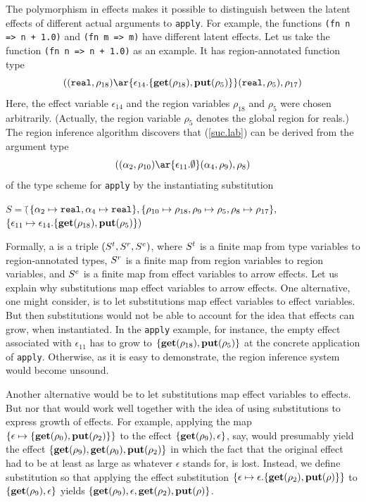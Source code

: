 \documentclass[12pt]{book}
\begin{document}
The polymorphism in effects makes it possible to distinguish between
the latent effects of different actual arguments to {\tt apply}. For
example, the functions {\tt (fn n => n + 1.0)} and {\tt (fn m => m)}
have different latent effects. Let us take the function {\tt (fn n =>
  n + 1.0)} as an example. It has region-annotated function type
\begin{equation}
\label{suc.lab}
((\boxml{real},\rho_{18})\ar{\epsilon_{14}.\{\Get(\rho_{18}),\Put(\rho_5)\}}(\boxml{real}, \rho_5), \rho_{17})
\end{equation}
Here, the effect variable $\epsilon_{14}$ and the region variables
$\rho_{18}$ and $\rho_5$ were chosen arbitrarily. (Actually, the region
variable $\rho_5$ denotes the global region for reals.) The region
inference algorithm discovers that (\ref{suc.lab}) can be derived from the argument type
$$((\alpha_2,\rho_{10})\ar{\epsilon_{11}.\emptyset}(\alpha_4,\rho_9),\rho_8)$$
of the type
scheme for {\tt apply} by the instantiating substitution
\begin{tabbing}
$S =($\=$\{\alpha_2\mapsto\hbox{\tt real},\alpha_4\mapsto\hbox{\tt real}\},\{
       \rho_{10}\mapsto\rho_{18},\rho_9\mapsto\rho_5,\rho_8\mapsto\rho_{17}\},$\\
\>$\{
       \epsilon_{11}\mapsto\epsilon_{14}.\{\mathop{\bf get}\nolimits(\rho_{18}),\mathop{\bf put}\nolimits(\rho_5)\})$
\end{tabbing}
Formally, a  is a triple
$(S^t,S^r,S^e)$, where $S^t$ is a finite map from type variables to
region-annotated types, $S^r$ is a finite map from region variables to
region variables, and $S^e$ is a finite map from effect variables to
arrow effects.  Let us explain why substitutions map
effect variables to arrow effects.  One alternative, one might
consider, is to let substitutions map effect variables to effect
variables. But then substitutions would not be able to account for the
idea that effects can grow, when instantiated. In the {\tt apply}
example, for instance, the empty effect associated with $\epsilon_{11}$
has to grow to $\{\mathop{\bf get}\nolimits(\rho_{18}),\mathop{\bf put}\nolimits(\rho_5)\}$ at the concrete
application of {\tt apply}. Otherwise, as it is easy to demonstrate,
the region inference system would become unsound.

Another alternative would be to let substitutions
map effect variables to effects. But nor that would work well together with the idea of
using substitutions to express growth of effects. For example, applying the
map $\{\epsilon\mapsto\{\mathop{\bf get}\nolimits(\rho_0),\mathop{\bf put}\nolimits(\rho_2)\}\}$ to the effect $\{\mathop{\bf get}\nolimits(\rho_9),\epsilon\}$,
say, 
would presumably yield the effect $\{\mathop{\bf get}\nolimits(\rho_9),\mathop{\bf get}\nolimits(\rho_0),\mathop{\bf put}\nolimits(\rho_2)\}$ in which the fact
that the original effect had to be at least as large as whatever $\epsilon$ stands for, is lost.
Instead, we define substitution so that applying the effect substitution
$\{\epsilon\mapsto\epsilon.\{\mathop{\bf get}\nolimits(\rho_2),\mathop{\bf put}\nolimits(\rho)\}\}$ to 
$\{\mathop{\bf get}\nolimits(\rho_9),\epsilon\}$ yields $\{\mathop{\bf get}\nolimits(\rho_9),\epsilon,\mathop{\bf get}\nolimits(\rho_2),\mathop{\bf put}\nolimits(\rho)\}$.
\end{document}
